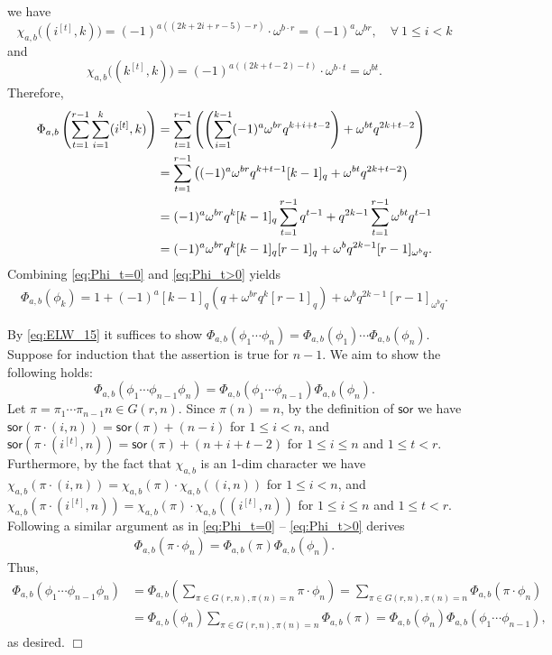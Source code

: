 \documentclass[a4paper, reqno, 11pt]{amsart}
\newcommand{\sor}{{\textsf{sor}}}
\numberwithin{equation}{section}
\def\qed{\hspace*{\fill} $\Box$ \medskip}
\begin{document}
we have $$\chi_{a,b}\big((i^{[t]},k)\big) = (-1)^{a((2k+2i+r-5)-r)}\cdot\omega^{b\cdot r} = (-1)^a\omega^{br}, \quad \forall \ 1\leq i<k$$
and $$\chi_{a,b}\big((k^{[t]},k)\big) = (-1)^{a((2k+t-2)-t)}\cdot\omega^{b\cdot t} = \omega^{bt}.$$
Therefore, 
\begin{align}
\Phi_{a,b}\left( \sum_{t=1}^{r-1}\sum_{i=1}^{k}(i^{[t]},k) \right) & = \sum_{t=1}^{r-1}\left( \left( \sum_{i=1}^{k-1}(-1)^{a}\omega^{br}q^{k+i+t-2} \right) + \omega^{bt}q^{2k+t-2} \right) \notag \\
& = \sum_{t=1}^{r-1}\left( (-1)^{a}\omega^{br}q^{k+t-1}[k-1]_q + \omega^{bt}q^{2k+t-2} \right) \notag \\
& = (-1)^{a}\omega^{br}q^{k}[k-1]_q\sum_{t=1}^{r-1}q^{t-1} + q^{2k-1}\sum_{t=1}^{r-1}\omega^{bt}q^{t-1} \notag \\
& = (-1)^{a}\omega^{br}q^{k}[k-1]_q[r-1]_q + \omega^b q^{2k-1}[r-1]_{\omega^b q}. \label{eq:Phi_t>0}
\end{align}
Combining \eqref{eq:Phi_t=0} and \eqref{eq:Phi_t>0} yields
\begin{align*}
\Phi_{a,b}(\phi_k) = 1 + (-1)^a[k-1]_q\left( q + \omega^{br}q^k[r-1]_q \right) + \omega^b q^{2k-1}[r-1]_{\omega^b q}.
\end{align*}

By \eqref{eq:ELW_15} it suffices to show $\Phi_{a,b}(\phi_1\cdots\phi_n)=\Phi_{a,b}(\phi_1)\cdots\Phi_{a,b}(\phi_n)$.
Suppose for induction that the assertion is true for $n-1$.
We aim to show the following holds: $$\Phi_{a,b}(\phi_1\cdots\phi_{n-1}\phi_n)=\Phi_{a,b}(\phi_1\cdots\phi_{n-1})\Phi_{a,b}(\phi_n).$$
Let $\pi=\pi_1\cdots\pi_{n-1}n\in G(r,n)$.
Since $\pi(n)=n$, by the definition of $\sor$ we have $\sor(\pi\cdot(i,n))=\sor(\pi)+(n-i)$ for $1\leq i<n$, and $\sor(\pi\cdot(i^{[t]},n))=\sor(\pi)+(n+i+t-2)$ for $1\leq i\leq n$ and $1\leq t<r$.
Furthermore, by the fact that $\chi_{a,b}$ is an 1-dim character we have $\chi_{a,b}(\pi\cdot(i,n))=\chi_{a,b}(\pi)\cdot\chi_{a,b}((i,n))$ for $1\leq i<n$, and $\chi_{a,b}(\pi\cdot(i^{[t]},n))=\chi_{a,b}(\pi)\cdot\chi_{a,b}((i^{[t]},n))$ for $1\leq i\leq n$ and $1\leq t<r$.
Following a similar argument as in \eqref{eq:Phi_t=0} -- \eqref{eq:Phi_t>0} derives 
\begin{align*}
\Phi_{a,b}(\pi\cdot\phi_n) = \Phi_{a,b}(\pi)\Phi_{a,b}(\phi_n).
\end{align*}
Thus, 
\begin{align*}
\Phi_{a,b}(\phi_1\cdots\phi_{n-1}\phi_n) & = \Phi_{a,b}\left( \sum_{\pi\in G(r,n),\pi(n)=n}\pi\cdot\phi_n \right) = \sum_{\pi\in G(r,n),\pi(n)=n} \Phi_{a,b}(\pi\cdot\phi_n) \\
& = \Phi_{a,b}(\phi_n) \sum_{\pi\in G(r,n),\pi(n)=n} \Phi_{a,b}(\pi) = \Phi_{a,b}(\phi_n)\Phi_{a,b}(\phi_1\cdots\phi_{n-1}),
\end{align*}
as desired. 
\qed
\end{document}
